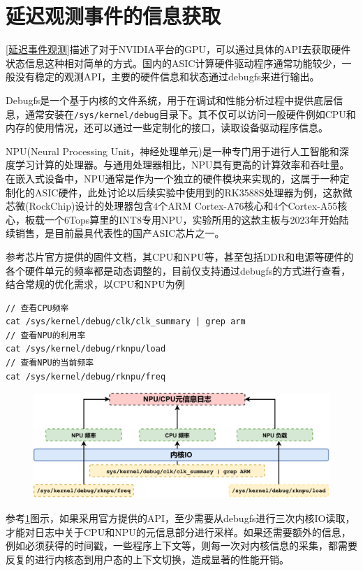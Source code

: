 \documentclass[master]{shtthesis}
\begin{document}
\section{延迟观测事件的信息获取}\label{延迟观测事件的信息获取}
\ref{延迟事件观测}描述了对于NVIDIA平台的GPU，可以通过具体的API去获取硬件状态信息这种相对简单的方式。国内的ASIC计算硬件驱动程序通常功能较少，一般没有稳定的观测API，主要的硬件信息和状态通过debugfs来进行输出。

Debugfs是一个基于内核的文件系统，用于在调试和性能分析过程中提供底层信息，通常安装在\verb*|/sys/kernel/debug|目录下。其不仅可以访问一般硬件例如CPU和内存的使用情况，还可以通过一些定制化的接口，读取设备驱动程序信息。

NPU(Neural Processing Unit，神经处理单元)是一种专门用于进行人工智能和深度学习计算的处理器。与通用处理器相比，NPU具有更高的计算效率和吞吐量。在嵌入式设备中，NPU通常是作为一个独立的硬件模块来实现的，这属于一种定制化的ASIC硬件，此处讨论以后续实验中使用到的RK3588S处理器为例，这款微芯微(RockChip)设计的处理器包含4个ARM Cortex-A76核心和4个Cortex-A55核心，板载一个6Tops算里的INT8专用NPU，实验所用的这款主板与2023年开始陆续销售，是目前最具代表性的国产ASIC芯片之一。

参考芯片官方提供的固件文档，其CPU和NPU等，甚至包括DDR和电源等硬件的各个硬件单元的频率都是动态调整的，目前仅支持通过debugfs的方式进行查看，结合常规的优化需求，以CPU和NPU为例
\begin{lstlisting}[caption={命令行查看rk3588硬件参数信息},captionpos=b]
// 查看CPU频率
cat /sys/kernel/debug/clk/clk_summary | grep arm 
// 查看NPU的利用率
cat /sys/kernel/debug/rknpu/load 
// 查看NPU的当前频率
cat /sys/kernel/debug/rknpu/freq 
\end{lstlisting}


\begin{figure}[htbp]
	\centering
	\includegraphics[width=12cm]{img/readk.pdf}
	\label{读取上述硬件信息需要的内核IO}
\end{figure}
参考\ref{读取上述硬件信息需要的内核IO}图示，如果采用官方提供的API，至少需要从debugfs进行三次内核IO读取，才能对日志中关于CPU和NPU的元信息部分进行采样。如果还需要额外的信息，例如必须获得的时间戳，一些程序上下文等，则每一次对内核信息的采集，都需要反复的进行内核态到用户态的上下文切换，造成显著的性能开销。
\end{document}
